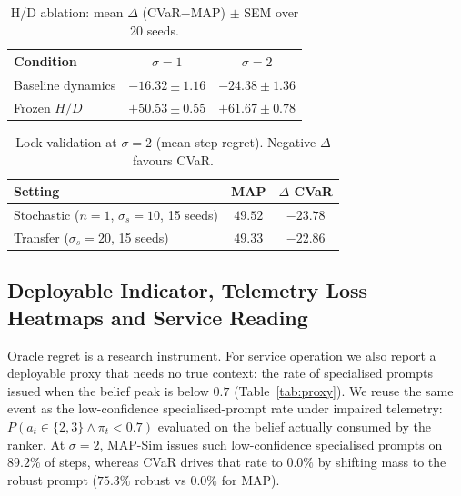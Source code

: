 \documentclass[journal]{IEEEtran}
\begin{document}
\begin{table}[t]
\centering
\caption{H/D ablation: mean \(\Delta\) (CVaR\(-\)MAP) \(\pm\) SEM over 20 seeds.}
\label{tab:hd}
\footnotesize
\begin{tabular}{@{}lcc@{}}
\toprule
Condition & \(\sigma=1\) & \(\sigma=2\) \\
\midrule
Baseline dynamics & \(-16.32\pm1.16\) & \(-24.38\pm1.36\) \\
Frozen \(H/D\) & \(+50.53\pm0.55\) & \(+61.67\pm0.78\) \\
\bottomrule
\end{tabular}
\end{table}

\begin{table}[t]
\centering
\caption{Lock validation at \(\sigma=2\) (mean step regret). Negative \(\Delta\) favours CVaR.}
\label{tab:lock}
\footnotesize
\begin{tabular}{@{}lcc@{}}
\toprule
Setting & MAP & \(\Delta\) CVaR \\
\midrule
Stochastic (\(n{=}1\), \(\sigma_s{=}10\), 15 seeds) & \(49.52\) & \(-23.78\) \\
Transfer (\(\sigma_s{=}20\), 15 seeds) & \(49.33\) & \(-22.86\) \\
\bottomrule
\end{tabular}
\end{table}

\subsection{Deployable Indicator, Telemetry Loss Heatmaps and Service Reading}
\label{sec:proxy}

Oracle regret is a research instrument.
For service operation we also report a deployable proxy that needs no true context: the rate of specialised prompts issued when the belief peak is below \(0.7\) (Table~\ref{tab:proxy}).
We reuse the same event as the low-confidence specialised-prompt rate under impaired telemetry: \(P(a_t\in\{2,3\}\wedge\pi_t{<}0.7)\) evaluated on the belief actually consumed by the ranker.
At \(\sigma=2\), MAP-Sim issues such low-confidence specialised prompts on \(89.2\%\) of steps, whereas CVaR drives that rate to \(0.0\%\) by shifting mass to the robust prompt (\(75.3\%\) robust vs \(0.0\%\) for MAP).
\end{document}
